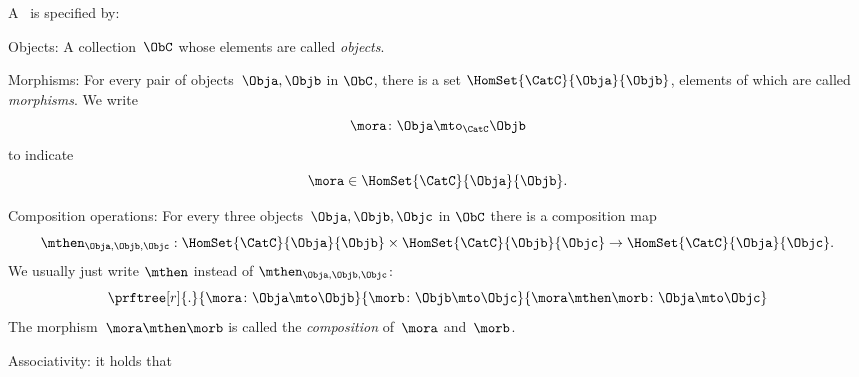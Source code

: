 \begin{ctdefinition}[Semicategory]
    \label{def:semicategory-compact}
    A \emph{}~\CatC is specified by:
    \begin{body}
        \constit
        \begin{compactenum}
            \item Objects: A collection\footnotemark~$\ObC$ whose elements are called \emph{objects}.
            \item Morphisms: For every pair of objects~$\Obja,\Objb$ in $\ObC$, there is a set $\HomSet{\CatC}{\Obja}{\Objb}$, elements of which are called \emph{morphisms}. We write
            \begin{equation}
                \mora \colon \Obja \mto_\CatC \Objb
            \end{equation}
            to indicate
            \begin{equation}
                \mora \in \HomSet{\CatC}{\Obja}{\Objb}.
            \end{equation}
            \item Composition operations: For every three objects~$\Obja,\Objb,\Objc$ in $\ObC$ there is a composition map
            \begin{equation}
                \mthen_{\Obja,\Objb,\Objc}: \HomSet{\CatC}{\Obja}{\Objb} \times \HomSet{\CatC}{\Objb}{\Objc}\to \HomSet{\CatC}{\Obja}{\Objc}.
            \end{equation}
            We usually just write $\mthen$ instead of $\mthen_{\Obja,\Objb,\Objc}$:
            \begin{equation}
                \prftree[r]{.}{
                    \mora \colon \Obja \mto \Objb
                }{
                    \morb\colon \Objb \mto \Objc
                }{
                    \mora \mthen \morb \colon \Obja \mto \Objc
                }
            \end{equation}
            The morphism~$\mora \mthen \morb$ is called the \emph{composition} of~$\mora$ and~$\morb$.
        \end{compactenum}
        \condit
        \begin{compactenum}
            \item Associativity: it holds that

\end{compactenum}
\end{body}
\end{ctdefinition}
